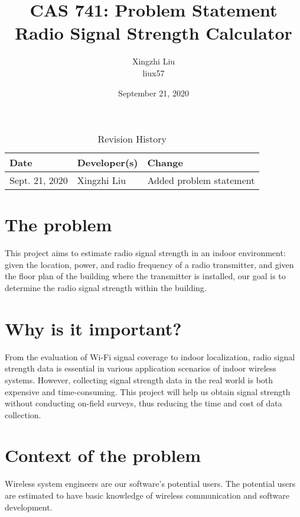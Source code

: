 \documentclass{article}
\title{CAS 741: Problem Statement\\Radio Signal Strength Calculator}
\author{Xingzhi Liu\\liux57}
\date{September 21, 2020}
\begin{document}
\maketitle

\begin{table}[hp]
\caption{Revision History} \label{TblRevisionHistory}
\begin{tabularx}{\textwidth}{llX}
\toprule
\textbf{Date} & \textbf{Developer(s)} & \textbf{Change}\\
\midrule
Sept. 21, 2020 & Xingzhi Liu & Added problem statement\\
\bottomrule
\end{tabularx}
\end{table}

\section{The problem} This project aims to estimate radio signal strength 
in an indoor environment: given the location, power, and radio frequency 
of a radio transmitter, and given the floor plan of the building where the 
transmitter is installed, our goal is to determine the radio signal strength 
within the building. 

\section{Why is it important?} 
From the evaluation of Wi-Fi signal coverage to indoor localization, radio 
signal strength data is essential in various application scenarios of indoor 
wireless systems. However, collecting signal strength data in the real world 
is both expensive and time-consuming. This project will help us obtain signal 
strength without conducting on-field surveys, thus reducing the time and cost 
of data collection.

\section{Context of the problem}
Wireless system engineers are our software's potential users. The potential 
users are estimated to have basic knowledge of wireless communication and 
software development.
\end{document}
